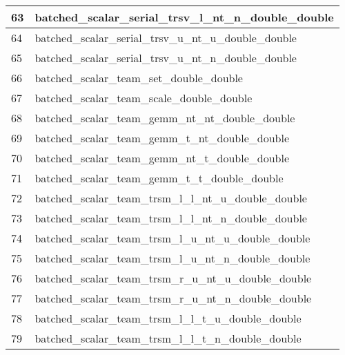\begin{table}[!htbp]
{\begin{tabular}{|>{\columncolor[HTML]{34FF34}}l |l|}
            \cellcolor[HTML]{FE0000}63 & batched\_scalar\_serial\_trsv\_l\_nt\_n\_double\_double             \\ \hline
            \cellcolor[HTML]{FE0000}64 & batched\_scalar\_serial\_trsv\_u\_nt\_u\_double\_double             \\ \hline
            \cellcolor[HTML]{FE0000}65 & batched\_scalar\_serial\_trsv\_u\_nt\_n\_double\_double             \\ \hline
            \cellcolor[HTML]{FE0000}66 & batched\_scalar\_team\_set\_double\_double                          \\ \hline
            \cellcolor[HTML]{FE0000}67 & batched\_scalar\_team\_scale\_double\_double                        \\ \hline
            \cellcolor[HTML]{D1B3FF}68 & batched\_scalar\_team\_gemm\_nt\_nt\_double\_double                 \\ \hline
            \cellcolor[HTML]{D1B3FF}69 & batched\_scalar\_team\_gemm\_t\_nt\_double\_double                  \\ \hline
            \cellcolor[HTML]{FE0000}70 & batched\_scalar\_team\_gemm\_nt\_t\_double\_double                  \\ \hline
            \cellcolor[HTML]{D1B3FF}71 & batched\_scalar\_team\_gemm\_t\_t\_double\_double                   \\ \hline
            72                         & batched\_scalar\_team\_trsm\_l\_l\_nt\_u\_double\_double            \\ \hline
            \cellcolor[HTML]{FE0000}73 & batched\_scalar\_team\_trsm\_l\_l\_nt\_n\_double\_double            \\ \hline
            74                         & batched\_scalar\_team\_trsm\_l\_u\_nt\_u\_double\_double            \\ \hline
            \cellcolor[HTML]{FE0000}75 & batched\_scalar\_team\_trsm\_l\_u\_nt\_n\_double\_double            \\ \hline
            76                         & batched\_scalar\_team\_trsm\_r\_u\_nt\_u\_double\_double            \\ \hline
            \cellcolor[HTML]{FE0000}77 & batched\_scalar\_team\_trsm\_r\_u\_nt\_n\_double\_double            \\ \hline
            \cellcolor[HTML]{FF00FF}78 & batched\_scalar\_team\_trsm\_l\_l\_t\_u\_double\_double             \\ \hline
            \cellcolor[HTML]{FF00FF}79 & batched\_scalar\_team\_trsm\_l\_l\_t\_n\_double\_double             \\ \hline

\end{tabular}}
\end{table}
